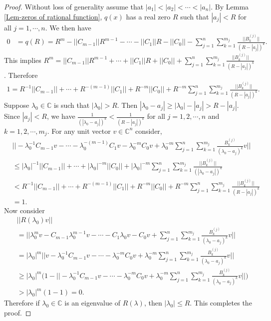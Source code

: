 \documentclass[12pt, reqno]{amsart}
\theoremstyle{definition}
\theoremstyle{remark}
\numberwithin{equation}{section}
\begin{document}
\begin{proof}
Without loss of generality assume that $|a_1| < |a_2| < \cdots < |a_n|$. By Lemma 
\ref{Lem-zeros of rational function}, $q(x)$ has a real zero $R$ such that $|a_j| < R$ 
for all $j=1,\cdots,n$. We 
then have 
\begin{align*}
0 & = q(R)=R^m - ||C_{m-1}|| R^{m-1} - \cdots - ||C_1|| R -||C_0||-\displaystyle 
\sum_{j=1}^{n} \sum_{k=1}^{m_j} \frac{||B_k^{(j)}||}{(R- |a_j|)^k}.
\end{align*} 
This implies $R^m  = ||C_{m-1}|| R^{m-1} + \cdots + ||C_1|| R + ||C_0||+\displaystyle 
\sum_{j=1}^{n} \sum_{k=1}^{m_j} \frac{||B_k^{(j)}||}{(R- |a_j|)^k}$. Therefore
\begin{align*}
1 = R^{-1}||C_{m-1}||  + \cdots + R^{-(m-1)} ||C_1|| + R^{-m} ||C_0||
+\displaystyle R^{-m} \sum_{j=1}^{n} \sum_{k=1}^{m_j} \frac{||B_k^{(j)}||}{(R- |a_j|)^k}.
\end{align*}
Suppose $\lambda_0 \in \mathbb{C}$ is such that $|\lambda_0| > R$. Then 
$|\lambda_0-a_j|\geq |\lambda_0|-|a_j|>R-|a_j|$. Since $|a_j| < R$, we have 
$\displaystyle \frac{1}{(|\lambda_0-a_j|)^k} < \frac{1}{(R-|a_j|)^k}$ for all 
$j=1,2,\cdots,n$ and $k=1,2,\cdots,m_j$. For any unit vector $v \in \mathbb{C}^n$ 
consider, 
\begin{align*}
& \Big|\Big| - \lambda_0^{-1}C_{m-1}v - \cdots - \lambda_0^{-(m-1)} C_1 v - 
\lambda_0^{-m} C_0 v+ \displaystyle \lambda_0^{-m} \sum_{j=1}^{n} \sum_{k=1}^{m_j} 
\frac{B_k^{(j)}}{(\lambda_0-a_j)^k} v \Big|\Big|\\
& \leq |\lambda_0|^{-1} ||C_{m-1}|| + \cdots + 
|\lambda_0|^{-m} ||C_0|| + \displaystyle |\lambda_0|^{-m} \sum_{j=1}^{n} \sum_{k=1}^{m_j} 
\frac{||B_k^{(j)}||}{(|\lambda_0-a_j|)^k} \\
& < R^{-1} ||C_{m-1}|| + \cdots + R^{-(m-1)} ||C_1|| + R^{-m} ||C_0|| + \displaystyle 
R^{-m} \sum_{j=1}^{n} \sum_{k=1}^{m_j} \frac{||B_k^{(j)}||}{(R-|a_j|)^k} \\
& =1.
\end{align*}
Now consider 
\begin{align*}
& ||R(\lambda_0)v|| \\
& =\Big|\Big| \lambda_0^m v- C_{m-1}\lambda_0^{m-1}v - \cdots -C_1 \lambda_0 v - 
C_0 v+ \displaystyle \sum_{j=1}^{n} \sum_{k=1}^{m_j} 
\frac{B_k^{(j)}}{(\lambda_0-a_j)^k} v\Big|\Big| \\
& = |\lambda_0|^m\Big|\Big|v- \lambda_0^{-1}C_{m-1}v - \cdots - 
\lambda_0^{-m} C_0 v+ \displaystyle \lambda_0^{-m} 
\sum_{j=1}^{n} \sum_{k=1}^{m_j} \frac{B_k^{(j)}}{(\lambda_0-a_j)^k} v \Big|\Big| \\
& \geq |\lambda_0|^m\Big(1-\Big|\Big| - \lambda_0^{-1}C_{m-1}v - \cdots - 
\lambda_0^{-m} C_0 v+ \displaystyle \lambda_0^{-m} 
\sum_{j=1}^{n} \sum_{k=1}^{m_j} \frac{B_k^{(j)}}{(\lambda_0-a_j)^k} v \Big|\Big| 
\Big)\\
& > |\lambda_0|^m(1-1) = 0.
\end{align*}
Therefore if $\lambda_0\in \mathbb{C}$ is an eigenvalue of $R(\lambda)$, then 
$|\lambda_0| \leq R$. This completes the proof.
\end{proof}
\end{document}
